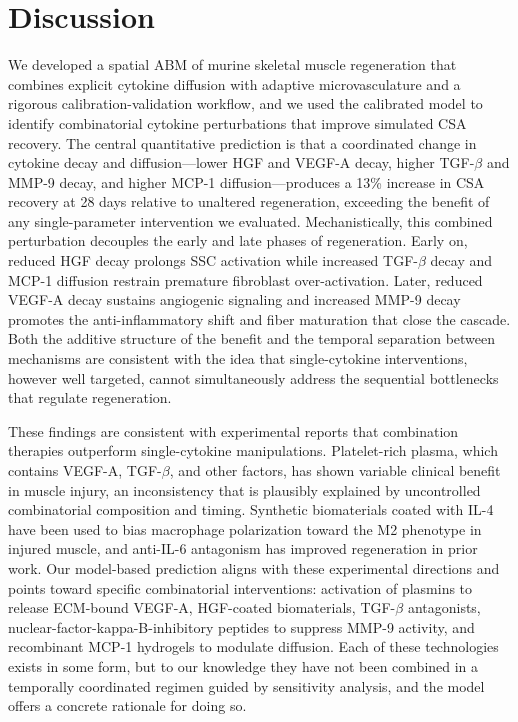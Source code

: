 \documentclass[10pt,letterpaper]{article}
\begin{document}
\section{Discussion}
\label{sec:discussion}

We developed a spatial ABM of murine skeletal muscle regeneration that combines explicit cytokine diffusion with adaptive microvasculature and a rigorous calibration-validation workflow, and we used the calibrated model to identify combinatorial cytokine perturbations that improve simulated CSA recovery. The central quantitative prediction is that a coordinated change in cytokine decay and diffusion---lower HGF and VEGF-A decay, higher TGF-$\beta$ and MMP-9 decay, and higher MCP-1 diffusion---produces a 13\% increase in CSA recovery at 28 days relative to unaltered regeneration, exceeding the benefit of any single-parameter intervention we evaluated. Mechanistically, this combined perturbation decouples the early and late phases of regeneration. Early on, reduced HGF decay prolongs SSC activation while increased TGF-$\beta$ decay and MCP-1 diffusion restrain premature fibroblast over-activation. Later, reduced VEGF-A decay sustains angiogenic signaling and increased MMP-9 decay promotes the anti-inflammatory shift and fiber maturation that close the cascade. Both the additive structure of the benefit and the temporal separation between mechanisms are consistent with the idea that single-cytokine interventions, however well targeted, cannot simultaneously address the sequential bottlenecks that regulate regeneration.

These findings are consistent with experimental reports that combination therapies outperform single-cytokine manipulations. Platelet-rich plasma, which contains VEGF-A, TGF-$\beta$, and other factors, has shown variable clinical benefit in muscle injury, an inconsistency that is plausibly explained by uncontrolled combinatorial composition and timing. Synthetic biomaterials coated with IL-4 have been used to bias macrophage polarization toward the M2 phenotype in injured muscle, and anti-IL-6 antagonism has improved regeneration in prior work. Our model-based prediction aligns with these experimental directions and points toward specific combinatorial interventions: activation of plasmins to release ECM-bound VEGF-A, HGF-coated biomaterials, TGF-$\beta$ antagonists, nuclear-factor-kappa-B-inhibitory peptides to suppress MMP-9 activity, and recombinant MCP-1 hydrogels to modulate diffusion. Each of these technologies exists in some form, but to our knowledge they have not been combined in a temporally coordinated regimen guided by sensitivity analysis, and the model offers a concrete rationale for doing so.
\end{document}
